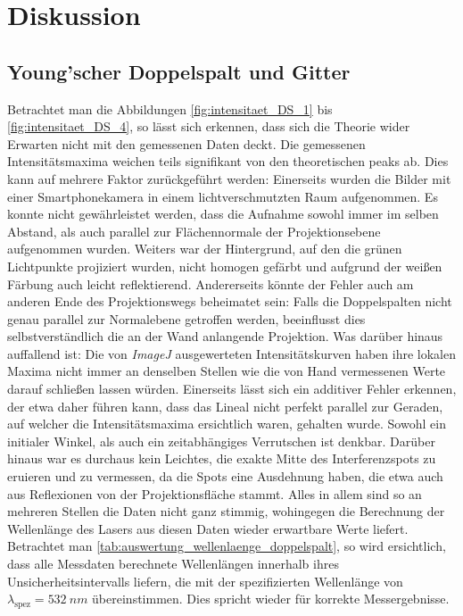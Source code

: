 \documentclass[ngerman]{scrartcl}
\begin{document}
\section{Diskussion}
\label{sec:diskussion}

\subsection{Young'scher Doppelspalt und Gitter}
\label{subsec:diskussion_doppelspalt_gitter_gitter}

Betrachtet man die Abbildungen \ref{fig:intensitaet_DS_1} bis \ref{fig:intensitaet_DS_4}, so lässt sich erkennen, dass sich die Theorie wider Erwarten nicht mit den gemessenen Daten deckt. Die gemessenen Intensitätsmaxima weichen teils signifikant von den theoretischen peaks ab. Dies kann auf mehrere Faktor zurückgeführt werden: Einerseits wurden die Bilder mit einer Smartphonekamera in einem lichtverschmutzten Raum aufgenommen. Es konnte nicht gewährleistet werden, dass die Aufnahme sowohl immer im selben Abstand, als auch parallel zur Flächennormale der Projektionsebene aufgenommen wurden. Weiters war der Hintergrund, auf den die grünen Lichtpunkte projiziert wurden, nicht homogen gefärbt und aufgrund der weißen Färbung auch leicht reflektierend. Andererseits könnte der Fehler auch am anderen Ende des Projektionswegs beheimatet sein: Falls die Doppelspalten nicht genau parallel zur Normalebene getroffen werden, beeinflusst dies selbstverständlich die an der Wand anlangende Projektion. Was darüber hinaus auffallend ist: Die von \textit{ImageJ} ausgewerteten Intensitätskurven haben ihre lokalen Maxima nicht immer an denselben Stellen wie die von Hand vermessenen Werte darauf schließen lassen würden. Einerseits lässt sich ein additiver Fehler erkennen, der etwa daher führen kann, dass das Lineal nicht perfekt parallel zur Geraden, auf welcher die Intensitätsmaxima ersichtlich waren, gehalten wurde. Sowohl ein initialer Winkel, als auch ein zeitabhängiges Verrutschen ist denkbar. Darüber hinaus war es durchaus kein Leichtes, die exakte Mitte des Interferenzspots zu eruieren und zu vermessen, da die Spots eine Ausdehnung haben, die etwa auch aus Reflexionen von der Projektionsfläche stammt. Alles in allem sind so an mehreren Stellen die Daten nicht ganz stimmig, wohingegen die Berechnung der Wellenlänge des Lasers aus diesen Daten wieder erwartbare Werte liefert. Betrachtet man \autoref{tab:auswertung_wellenlaenge_doppelspalt}, so wird ersichtlich, dass alle Messdaten berechnete Wellenlängen innerhalb ihres Unsicherheitsintervalls liefern, die mit der spezifizierten Wellenlänge von $\lambda_{\text{spez}}=\SI{532}{nm}$ übereinstimmen. Dies spricht wieder für korrekte Messergebnisse.
\end{document}
